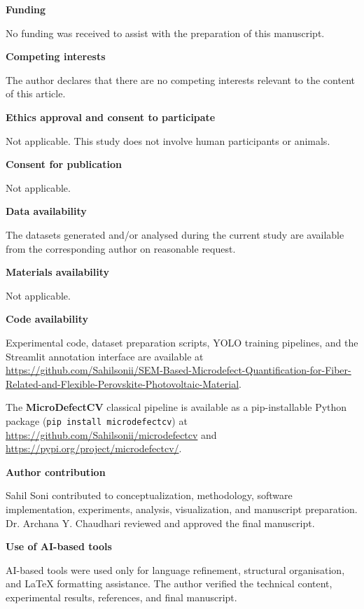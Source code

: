 \documentclass[pdflatex,sn-mathphys-num,iicol]{sn-jnl}
\theoremstyle{thmstyleone}
\theoremstyle{thmstyletwo}
\theoremstyle{thmstylethree}
\begin{document}
\smallskip
\noindent\textbf{Funding}

No funding was received to assist with the preparation of this manuscript.

\smallskip
\noindent\textbf{Competing interests}

The author declares that there are no competing interests relevant to the content of this article.

\smallskip
\noindent\textbf{Ethics approval and consent to participate}

Not applicable. This study does not involve human participants or animals.

\smallskip
\noindent\textbf{Consent for publication}

Not applicable.

\smallskip
\noindent\textbf{Data availability}

The datasets generated and/or analysed during the current study are available from the corresponding author on reasonable request.

\smallskip
\noindent\textbf{Materials availability}

Not applicable.

\smallskip
\noindent\textbf{Code availability}

Experimental code, dataset preparation scripts, YOLO training pipelines, and the Streamlit annotation interface are available at \url{https://github.com/Sahilsonii/SEM-Based-Microdefect-Quantification-for-Fiber-Related-and-Flexible-Perovskite-Photovoltaic-Material}.

The \textbf{MicroDefectCV} classical pipeline is available as a pip-installable Python package (\texttt{pip install microdefectcv}) at \url{https://github.com/Sahilsonii/microdefectcv} and \url{https://pypi.org/project/microdefectcv/}.

\smallskip
\noindent\textbf{Author contribution}

Sahil Soni contributed to conceptualization, methodology, software implementation, experiments, analysis, visualization, and manuscript preparation. Dr. Archana Y. Chaudhari reviewed and approved the final manuscript.

\smallskip
\noindent\textbf{Use of AI-based tools}

AI-based tools were used only for language refinement, structural organisation, and LaTeX formatting assistance. The author verified the technical content, experimental results, references, and final manuscript.

\end{document}
